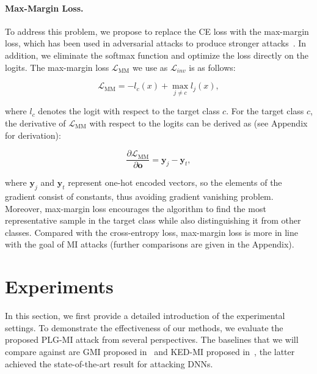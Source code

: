 \documentclass[letterpaper]{article} %
\begin{document}
\paragraph{Max-Margin Loss.}
To address this problem, we propose to replace the CE loss with the max-margin loss, which has been used in adversarial attacks to produce stronger attacks~\cite{carlini2017towards, sriramanan2020guided}. In addition, we eliminate the softmax function and optimize the loss directly on the logits. The max-margin loss $\mathcal{L}_\text{MM}$ we use as $\mathcal{L}_{inv}$ is as follows:
\begin{linenomath*}
\begin{equation}\label{eq:maximum_margin_loss}
\mathcal{L}_\text{MM} = -l_{c}(x) + \max_{j \neq c}l_{j}(x),
\end{equation}
\end{linenomath*}
where $l_{c}$ denotes the logit with respect to the target class $c$. For the target class $c$, the derivative of $\mathcal{L}_\text{MM}$ with respect to the logits can be derived as (see Appendix for derivation):
\begin{linenomath*}
\begin{equation}
\frac{\partial \mathcal{L}_\text{MM}}{\partial \mathbf{o}}=\mathbf{y}_{j}-\mathbf{y}_{t},
\end{equation}
\end{linenomath*}
where $\mathbf{y}_{j}$ and $\mathbf{y}_{t}$ represent one-hot encoded vectors, so the elements of the gradient consist of constants, thus avoiding gradient vanishing problem. Moreover, max-margin loss encourages the algorithm to find the most representative sample in the target class while also distinguishing it from other classes. Compared with the cross-entropy loss, max-margin loss is more in line with the goal of MI attacks (further comparisons are given in the Appendix).
    
    
\section{Experiments}\label{sec:experiment}
In this section, we first provide a detailed introduction of the experimental settings. To demonstrate the effectiveness of our methods, we evaluate the proposed PLG-MI attack from several perspectives. The baselines that we will compare against are GMI proposed in~\cite{zhang2020secret} and KED-MI proposed in~\cite{chen2021knowledge}, the latter achieved the state-of-the-art result for attacking DNNs.
\end{document}
